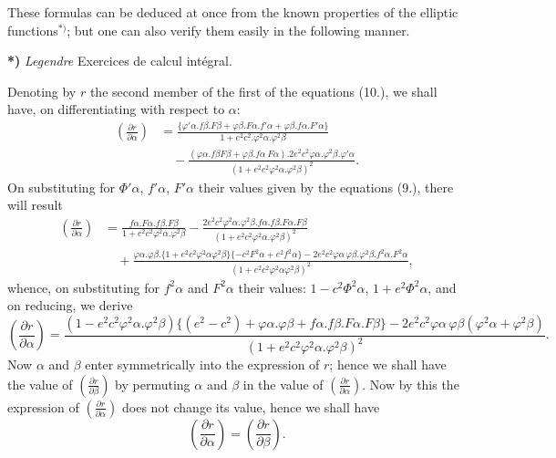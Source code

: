 \documentclass{article}
\begin{document}
These formulas can be deduced at once from the known properties of the elliptic functions${}^{*)}$; but one can also verify them easily in the following manner.

\textbf{*)} \emph{Legendre} Exercices de calcul intégral.


Denoting by $r$ the second member of the first of the equations (10.), we shall have, on differentiating with respect to $\alpha$:
\[ \begin{aligned} \left(\frac{\partial r}{\partial\alpha}\right)&=\frac{\{\varphi'\alpha.f\beta.F\beta+\varphi\beta.F\alpha.f'\alpha+\varphi\beta.f\alpha.F'\alpha\}}{1+e^{2}c^{2}.\varphi^{2}\alpha.\varphi^{2}\beta}\\ &\quad-\frac{(\varphi\alpha.f\beta F\beta+\varphi\beta.f\alpha\ F\alpha).2e^{2}c^{2}\varphi\alpha.\varphi^{2}\beta.\varphi'\alpha}{(1+e^{2}c^{2}\varphi^{2}\alpha.\varphi^{2}\beta)^{2}}. \end{aligned} \]
On substituting for $\Phi'\alpha$, $f'\alpha$, $F'\alpha$ their values given by the equations (9.), there will result
\[ \begin{aligned} \left(\frac{\partial r}{\partial\alpha}\right)&=\frac{f\alpha.F\alpha.f\beta.F\beta}{1+e^{2}c^{2}\varphi^{2}\alpha.\varphi^{2}\beta}-\frac{2e^{2}c^{2}\varphi^{2}\alpha.\varphi^{2}\beta.f\alpha.f\beta.F\alpha.F\beta}{(1+e^{2}c^{2}\varphi^{2}\alpha.\varphi^{2}\beta)^{2}}\\ &\quad+\frac{\varphi\alpha.\varphi\beta.\{1+e^{2}c^{2}\varphi^{2}\alpha\varphi^{2}\beta\}\{-c^{2}F^{2}\alpha+e^{2}f^{2}\alpha\}-2e^{2}c^{2}\varphi\alpha\,\varphi\beta.\varphi^{2}\beta.f^{2}\alpha.F^{2}\alpha}{(1+e^{2}c^{2}\varphi^{2}\alpha\varphi^{2}\beta)^{2}}, \end{aligned} \]
whence, on substituting for $f^{2}\alpha$ and $F^{2}\alpha$ their values: $1-c^{2}\Phi^{2}\alpha$, $1+e^{2}\Phi^{2}\alpha$, and on reducing, we derive
\[ \left(\frac{\partial r}{\partial\alpha}\right)=\frac{(1-e^{2}c^{2}\varphi^{2}\alpha.\varphi^{2}\beta)\{(e^{2}-c^{2})+\varphi\alpha.\varphi\beta+f\alpha.f\beta.F\alpha.F\beta\}-2e^{2}c^{2}\varphi\alpha\,\varphi\beta(\varphi^{2}\alpha+\varphi^{2}\beta)}{(1+e^{2}c^{2}\varphi^{2}\alpha.\varphi^{2}\beta)^{2}}. \]
Now $\alpha$ and $\beta$ enter symmetrically into the expression of $r$; hence we shall have the value of $\left(\frac{\partial r}{\partial\beta}\right)$ by permuting $\alpha$ and $\beta$ in the value of $\left(\frac{\partial r}{\partial\alpha}\right)$. Now by this the expression of $\left(\frac{\partial r}{\partial\alpha}\right)$ does not change its value, hence we shall have
\[ \left(\frac{\partial r}{\partial\alpha}\right)=\left(\frac{\partial r}{\partial\beta}\right). \]
\end{document}
